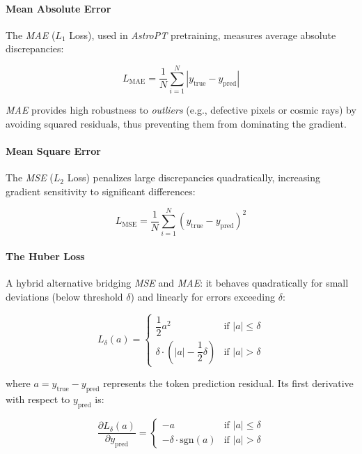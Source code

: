 \paragraph{Mean Absolute Error}

The \textit{\gls{MAE}} ($L_1$ Loss), used in \textit{AstroPT} pretraining, measures average absolute discrepancies:

\begin{equation}
L_{\text{MAE}} = \dfrac{1}{N} \sum_{i=1}^{N} |y_{\text{true}} - y_{\text{pred}}|
\label{eq:mae_loss}
\end{equation}

\textit{\gls{MAE}} provides high robustness to \textit{outliers} (e.g., defective pixels or cosmic rays) by avoiding squared residuals, thus preventing them from dominating the gradient.

\paragraph{Mean Square Error} The \textit{\gls{MSE}} ($L_2$ Loss) penalizes large discrepancies quadratically, increasing gradient sensitivity to significant differences:

\begin{equation}
	L_{\text{MSE}} = \dfrac{1}{N} \sum_{i=1}^{N} \left(y_{\text{true}} - y_{\text{pred}}\right)^2
	\label{eq:mse_loss}
\end{equation}

\paragraph{The Huber Loss} A hybrid alternative bridging \textit{\gls{MSE}} and \textit{\gls{MAE}}: it behaves quadratically for small deviations (below threshold $\delta$) and linearly for errors exceeding $\delta$:

\begin{equation}
L_{\delta}\left(a\right) = \begin{cases}
\dfrac{1}{2}a^2 & \text{if } |a| \le \delta \\
\delta \cdot \left(|a| - \dfrac{1}{2}\delta\right) & \text{if } |a| > \delta
\end{cases}
\label{eq:huber_loss}
\end{equation}

where $a = y_{\text{true}} - y_{\text{pred}}$ represents the token prediction residual. Its first derivative with respect to $y_{\text{pred}}$ is:

\begin{equation}
\dfrac{\partial L_{\delta}\left(a\right)}{\partial y_{\text{pred}}} = \begin{cases}
-a & \text{if } |a| \le \delta \\
-\delta \cdot \text{sgn}\left(a\right) & \text{if } |a| > \delta
\end{cases}
\label{eq:huber_derivative}
\end{equation}

